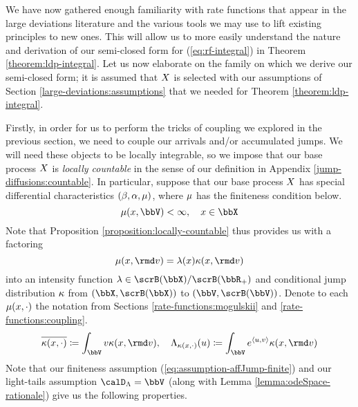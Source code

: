 We have now gathered enough familiarity with rate functions that appear in the large deviations literature and the various tools we may use to lift existing principles to new ones.
This will allow us to more easily understand the nature and derivation of our semi-closed form for (\ref{eq:rf-integral}) in Theorem \ref{theorem:ldp-integral}.
Let us now elaborate on the family on which we derive our semi-closed form; it is assumed that $X$ is selected with our assumptions of Section \ref{large-deviations:assumptions} that we needed for Theorem \ref{theorem:ldp-integral}.

Firstly, in order for us to perform the tricks of coupling we explored in the previous section, we need to couple our arrivals and/or accumulated jumps.
We will need these objects to be locally integrable, so we impose that our base process $X$ is \emph{locally countable} in the sense of our definition in Appendix \ref{jump-diffusions:countable}.
In particular, suppose that our base process $X$ has special differential characteristics $(\beta, \alpha, \mu)$, where $\mu$ has the finiteness condition below.
\begin{equation}
  \label{eq:assumption-affJump-finite}
  \affJump(\stateVar, \vecSpace) < \infty, \quad \stateVar \in \stateSpace
\end{equation}
Note that Proposition \ref{proposition:locally-countable} thus provides us with a factoring 
\begin{equation}
  \label{eq:affJump-factoring}
  \affJump(\stateVar,\rmd\markVar) = \affInt(\stateVar) \affDist(\stateVar, \rmd\markVar)
\end{equation}
into an intensity function $\affInt \in \scrB(\stateSpace)/\scrB(\bbR_+)$ and conditional jump distribution $\kappa$ from $(\stateSpace, \scrB(\stateSpace))$ to $(\vecSpace, \scrB(\vecSpace))$.
Denote to each $\mu(x, \cdot)$ the notation from Sections \ref{rate-functions:mogulskii} and \ref{rate-functions:coupling}.
\begin{equation*}
  \overline{\affDist(\stateVar, \cdot)} \defeq \int_\vecSpace \markVar \affDist(\stateVar, \rmd\markVar), \quad
  \ode_{\affDist(\stateVar,\cdot)}(\momentVar) \defeq \int_\vecSpace e^\prj{\momentVar}{\markVar} \affDist(\stateVar, \rmd\markVar)
\end{equation*}
Note that our finiteness assumption (\ref{eq:assumption-affJump-finite}) and our light-tails assumption $\odeSpace = \vecSpace$ (along with Lemma \ref{lemma:odeSpace-rationale}) give us the following properties.
